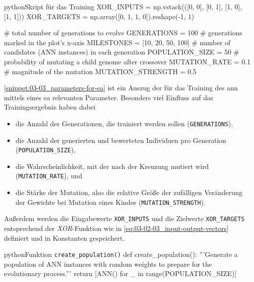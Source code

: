 \begin{snippet}[h]
    \centering
    \begin{codebox}{python}{Skript für das Training}
        XOR_INPUTS = np.vstack(([0, 0], [0, 1], [1, 0], [1, 1]))
        XOR_TARGETS = np.array([0, 1, 1, 0]).reshape(-1, 1)

        # total number of generations to evolve
        GENERATIONS = 100               
        # generations marked in the plot's x-axis
        MILESTONES = [10, 20, 50, 100]  
        # number of candidates (ANN instances) in each generation
        POPULATION_SIZE = 50            
        # probability of mutating a child genome after crossover
        MUTATION_RATE = 0.1             
        # magnitude of the mutation
        MUTATION_STRENGTH = 0.5         
    \end{codebox}
    \caption{Parameter zur Konfiguration des \acrshort{ea}}
    \label{snippet:03-03_parameters-for-ea}
\end{snippet}

\autoref{snippet:03-03_parameters-for-ea} ist ein Auszug der für das Training des \Gls{ann} mittels eines \Gls{ea} relevanten Parameter. Besonders viel Einfluss auf das Trainingsergebnis haben dabei

\begin{itemize}
    \item die Anzahl der Generationen, die trainiert werden sollen (\texttt{GENERATIONS}),
    \item die Anzahl der generierten und bewerteten Individuen pro Generation (\texttt{POPULATION\_SIZE}),
    \item die Wahrscheinlichkeit, mit der nach der Kreuzung mutiert wird (\texttt{MUTATION\_RATE}), und
    \item die Stärke der Mutation, also die relative Größe der zufälligen Veränderung der Gewichte bei Mutation eines Kindes (\texttt{MUTATION\_STRENGTH}).
\end{itemize}

Außerdem werden die Eingabewerte \texttt{XOR\_INPUTS} und die Zielwerte \texttt{XOR\_TARGETS} entsprechend der \textit{XOR}-Funktion wie in \autoref{eq:03-02-03_input-output-vectors} definiert und in Konstanten gespeichert.

\begin{snippet}[h]
    \centering
    \begin{codebox}{python}{Funktion \texttt{create\_population()}}
        def create_population():
            '''Generate a population of ANN instances with random weights to prepare for the evolutionary process.'''
            return [ANN() for _ in range(POPULATION_SIZE)]
    \end{codebox}
    \caption{Implementierung der Funktion \texttt{create\_population()}}
    \label{snippet:03-03_create-population-function}
\end{snippet}

